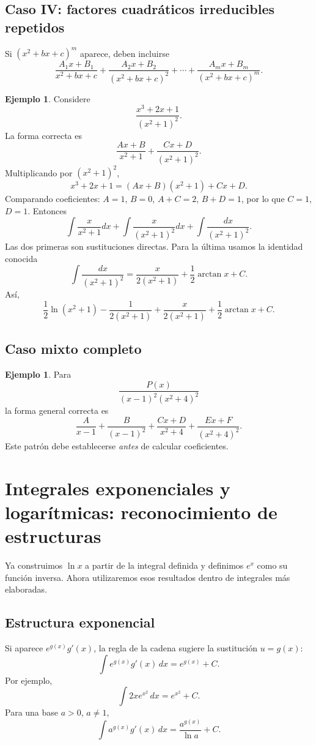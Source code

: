 \documentclass[12pt]{article}
\theoremstyle{definition}\newtheorem{definicion}[teorema]{Definición}\newtheorem{ejemplo}[teorema]{Ejemplo}\newtheorem{ejercicio}[teorema]{Ejercicio}
\theoremstyle{remark}\newtheorem*{observacion}{Observación}\newtheorem*{advertencia}{Advertencia}\newtheorem*{estrategia}{Estrategia}
\begin{document}
\subsection{Caso IV: factores cuadráticos irreducibles repetidos}
Si $(x^2+bx+c)^m$ aparece, deben incluirse
\[\frac{A_1x+B_1}{x^2+bx+c}+\frac{A_2x+B_2}{(x^2+bx+c)^2}+\cdots+\frac{A_mx+B_m}{(x^2+bx+c)^m}.\]
\begin{ejemplo}Considere
\[\frac{x^3+2x+1}{(x^2+1)^2}.\]
La forma correcta es
\[\frac{Ax+B}{x^2+1}+\frac{Cx+D}{(x^2+1)^2}.\]
Multiplicando por $(x^2+1)^2$,
\[x^3+2x+1=(Ax+B)(x^2+1)+Cx+D.\]
Comparando coeficientes: $A=1$, $B=0$, $A+C=2$, $B+D=1$, por lo que $C=1$, $D=1$. Entonces
\[\int\frac{x}{x^2+1}dx+\int\frac{x}{(x^2+1)^2}dx+\int\frac{dx}{(x^2+1)^2}.\]
Las dos primeras son sustituciones directas. Para la última usamos la identidad conocida
\[\int\frac{dx}{(x^2+1)^2}=\frac{x}{2(x^2+1)}+\frac12\arctan x+C.\]
Así,
\[\boxed{\frac12\ln(x^2+1)-\frac1{2(x^2+1)}+\frac{x}{2(x^2+1)}+\frac12\arctan x+C}.\]\end{ejemplo}

\subsection{Caso mixto completo}
\begin{ejemplo}Para
\[\frac{P(x)}{(x-1)^2(x^2+4)^2}\]
la forma general correcta es
\[\frac{A}{x-1}+\frac{B}{(x-1)^2}+\frac{Cx+D}{x^2+4}+\frac{Ex+F}{(x^2+4)^2}.\]
Este patrón debe establecerse \emph{antes} de calcular coeficientes.\end{ejemplo}

\section{Integrales exponenciales y logarítmicas: reconocimiento de estructuras}
Ya construimos $\ln x$ a partir de la integral definida y definimos $e^x$ como su función inversa. Ahora utilizaremos esos resultados dentro de integrales más elaboradas.

\subsection{Estructura exponencial}
Si aparece $e^{g(x)}g'(x)$, la regla de la cadena sugiere la sustitución $u=g(x)$:
\[
\boxed{\int e^{g(x)}g'(x)\,dx=e^{g(x)}+C.}
\]
Por ejemplo,
\[
\int 2x e^{x^2}\,dx=e^{x^2}+C.
\]
Para una base $a>0$, $a\neq1$,
\[
\boxed{\int a^{g(x)}g'(x)\,dx=\frac{a^{g(x)}}{\ln a}+C.}
\]
\end{document}
